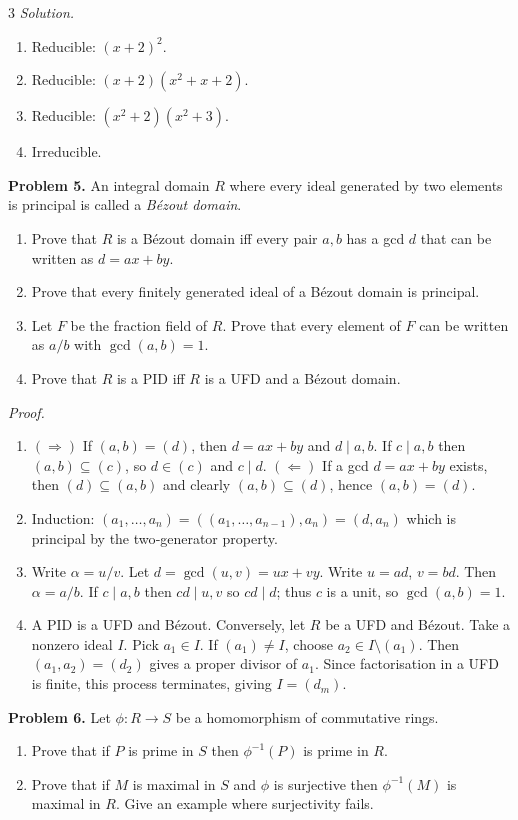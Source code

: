 \documentclass[10pt,landscape]{article}
\begin{document}
\begin{multicols}{3}
\textit{Solution.}
\begin{enumerate}
\item Reducible: \((x+2)^2\).
\item Reducible: \((x+2)(x^{2}+x+2)\).
\item Reducible: \((x^{2}+2)(x^{2}+3)\).
\item Irreducible.
\end{enumerate}

\noindent\textbf{Problem 5.} An integral domain \(R\) where every ideal generated by two elements is principal is called a \emph{Bézout domain}.
\begin{enumerate}
\item Prove that \(R\) is a Bézout domain iff every pair \(a,b\) has a gcd \(d\) that can be written as \(d=ax+by\).
\item Prove that every finitely generated ideal of a Bézout domain is principal.
\item Let \(F\) be the fraction field of \(R\). Prove that every element of \(F\) can be written as \(a/b\) with \(\gcd(a,b)=1\).
\item Prove that \(R\) is a PID iff \(R\) is a UFD and a Bézout domain.
\end{enumerate}

\textit{Proof.}
\begin{enumerate}
\item \((\Rightarrow)\) If \((a,b)=(d)\), then \(d=ax+by\) and \(d\mid a,b\). If \(c\mid a,b\) then \((a,b)\subseteq(c)\), so \(d\in(c)\) and \(c\mid d\). \((\Leftarrow)\) If a gcd \(d=ax+by\) exists, then \((d)\subseteq(a,b)\) and clearly \((a,b)\subseteq(d)\), hence \((a,b)=(d)\).
\item Induction: \((a_1,\dots,a_n)=((a_1,\dots,a_{n-1}),a_n)=(d,a_n)\) which is principal by the two‑generator property.
\item Write \(\alpha=u/v\). Let \(d=\gcd(u,v)=ux+vy\). Write \(u=ad\), \(v=bd\). Then \(\alpha=a/b\). If \(c\mid a,b\) then \(cd\mid u,v\) so \(cd\mid d\); thus \(c\) is a unit, so \(\gcd(a,b)=1\).
\item A PID is a UFD and Bézout. Conversely, let \(R\) be a UFD and Bézout. Take a nonzero ideal \(I\). Pick \(a_1\in I\). If \((a_1)\neq I\), choose \(a_2\in I\setminus(a_1)\). Then \((a_1,a_2)=(d_2)\) gives a proper divisor of \(a_1\). Since factorisation in a UFD is finite, this process terminates, giving \(I=(d_m)\). 
\end{enumerate}

\noindent\textbf{Problem 6.} Let \(\phi:R\to S\) be a homomorphism of commutative rings.
\begin{enumerate}
\item Prove that if \(P\) is prime in \(S\) then \(\phi^{-1}(P)\) is prime in \(R\).
\item Prove that if \(M\) is maximal in \(S\) and \(\phi\) is surjective then \(\phi^{-1}(M)\) is maximal in \(R\). Give an example where surjectivity fails.
\end{enumerate}


\end{multicols}
\end{document}
